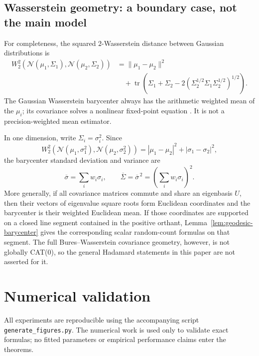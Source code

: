 \documentclass[11pt,a4paper]{article}
\theoremstyle{remark}
\newcommand{\tr}{\operatorname{tr}}
\begin{document}
\subsection{Wasserstein geometry: a boundary case, not the main model}
\label{subsec:wasserstein}

For completeness, the squared \(2\)-Wasserstein distance between Gaussian distributions is \cite{takatsu2011,malago2018}
\begin{align}
\label{eq:gaussian-W2}
 W_2^2\!\left(\mathcal N(\mu_1,\Sigma_1),
 \mathcal N(\mu_2,\Sigma_2)\right)
 &=\|\mu_1-\mu_2\|^2\\
 &\quad+\tr\!\left(\Sigma_1+\Sigma_2
 -2(\Sigma_2^{1/2}\Sigma_1\Sigma_2^{1/2})^{1/2}\right).\nonumber
\end{align}
The Gaussian Wasserstein barycenter always has the arithmetic weighted mean of the \(\mu_i\); its covariance solves a nonlinear fixed-point equation \cite{alvarez2016}.  It is not a precision-weighted mean estimator.

In one dimension, write \(\Sigma_i=\sigma_i^2\).  Since
\[
 W_2^2\!\left(\mathcal N(\mu_1,\sigma_1^2),
 \mathcal N(\mu_2,\sigma_2^2)\right)
 =|\mu_1-\mu_2|^2+|\sigma_1-\sigma_2|^2,
\]
the barycenter standard deviation and variance are
\begin{equation}
\label{eq:w2-1d-correction}
 \overline\sigma=\sum_iw_i\sigma_i,
 \qquad
 \overline\Sigma=\overline\sigma^{\,2}
 =\left(\sum_iw_i\sigma_i\right)^2.
\end{equation}
More generally, if all covariance matrices commute and share an eigenbasis \(U\), then their vectors of eigenvalue square roots form Euclidean coordinates and the barycenter is their weighted Euclidean mean.  If those coordinates are supported on a closed line segment contained in the positive orthant, Lemma~\ref{lem:geodesic-barycenter} gives the corresponding scalar random-count formulas on that segment.  The full Bures--Wasserstein covariance geometry, however, is not globally CAT(0), so the general Hadamard statements in this paper are not asserted for it.

\section{Numerical validation}
\label{sec:numerics}

All experiments are reproducible using the accompanying script \texttt{generate\_figures.py}.  The numerical work is used only to validate exact formulas; no fitted parameters or empirical performance claims enter the theorems.
\end{document}
